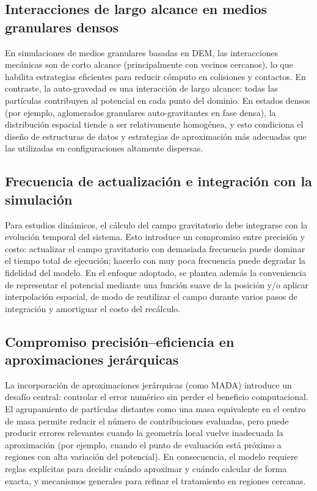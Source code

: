 \documentclass[a4paper,11pt]{book}
\begin{document}
\subsection{Interacciones de largo alcance en medios granulares densos}

En simulaciones de medios granulares basadas en DEM, las interacciones mecánicas son de corto alcance (principalmente con vecinos cercanos), lo que habilita estrategias eficientes para reducir cómputo en colisiones y contactos. En contraste, la auto-gravedad es una interacción de largo alcance: todas las partículas contribuyen al potencial en cada punto del dominio. En estados densos (por ejemplo, aglomerados granulares auto-gravitantes en fase densa), la distribución espacial tiende a ser relativamente homogénea, y esto condiciona el diseño de estructuras de datos y estrategias de aproximación más adecuadas que las utilizadas en configuraciones altamente dispersas.

\subsection{Frecuencia de actualización e integración con la simulación}

Para estudios dinámicos, el cálculo del campo gravitatorio debe integrarse con la evolución temporal del sistema. Esto introduce un compromiso entre precisión y costo: actualizar el campo gravitatorio con demasiada frecuencia puede dominar el tiempo total de ejecución; hacerlo con muy poca frecuencia puede degradar la fidelidad del modelo. En el enfoque adoptado, se plantea además la conveniencia de representar el potencial mediante una función suave de la posición y/o aplicar interpolación espacial, de modo de reutilizar el campo durante varios pasos de integración y amortiguar el costo del recálculo.

\subsection{Compromiso precisión--eficiencia en aproximaciones jerárquicas}

La incorporación de aproximaciones jerárquicas (como MADA) introduce un desafío central: controlar el error numérico sin perder el beneficio computacional. El agrupamiento de partículas distantes como una masa equivalente en el centro de masa permite reducir el número de contribuciones evaluadas, pero puede producir errores relevantes cuando la geometría local vuelve inadecuada la aproximación (por ejemplo, cuando el punto de evaluación está próximo a regiones con alta variación del potencial). En consecuencia, el modelo requiere reglas explícitas para decidir cuándo aproximar y cuándo calcular de forma exacta, y mecanismos generales para refinar el tratamiento en regiones cercanas.
\end{document}
